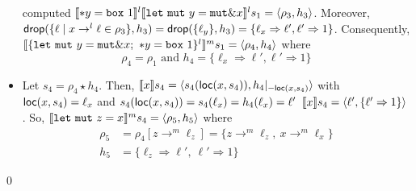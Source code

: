 \begin{example}
\begin{itemize}
    computed $\denl[\mathtt{*}y = \mathtt{box}\ 1]{l}{
    \denl[\mathtt{let\ mut}\ y = \mathtt{mut}\borrow x]{l}{s_1}} =
    \langle\rho_3,h_3\rangle$. Moreover,
    $\drop(\{\ell\mid x\to^l\ell\in\rho_3\},h_3) = \drop(\{\ell_y\},h_3) =
    \{\ell_x\Rightarrow\ell',\ell'\Rightarrow 1\}$. Consequently,
    $\denl[\{\mathtt{let\ mut}\ y = \mathtt{mut}\borrow x;\
    \mathtt{*}y = \mathtt{box}\ 1\}^l]{m}{s_1} =
    \langle \rho_4,h_4\rangle$ where
    \[\rho_4 = \rho_1 \text{ and } h_4 = \{\ell_x\Rightarrow\ell',\ell'\Rightarrow 1\}\]
    \item Let $s_4 = \rho_4 \star h_4$. Then,
    $\den[x]{s_4} =
    \langle s_4(\loc(x,s_4)), {h_4}|_{-\loc(x,s_4)}\rangle$
    with $\loc(x,s_4)=\ell_x$ and $s_4(\loc(x,s_4)) = s_4(\ell_x)
    = h_4(\ell_x)=\ell'$\ie
    $\den[x]{s_4} = \langle \ell', \{\ell'\Rightarrow 1\} \rangle$.
    So, $\denl[\mathtt{let\ mut}\ z = x]{m}{s_4} = \langle \rho_5,h_5\rangle$
    where
    \begin{align*}
      \rho_5 & = \rho_4[z\to^m \ell_z] = \{z\to^m \ell_z,\ x\to^m\ell_x\}\\
      h_5 & = \{\ell_z\Rightarrow \ell',\ \ell'\Rightarrow 1\}
    \end{align*}
  \end{itemize}
  \qed
\end{example}

